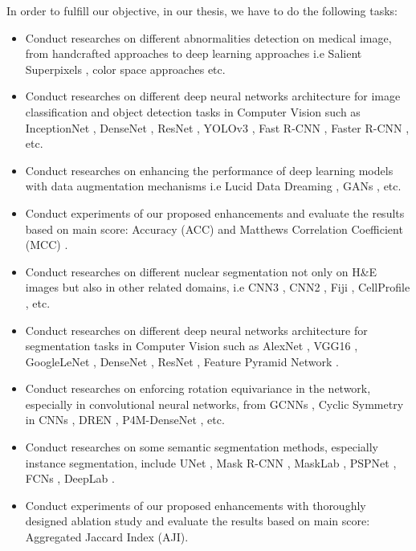 In order to fulfill our objective, in our thesis, we have to do the following tasks:
\begin{itemize}
\item Conduct researches on different abnormalities detection on medical image, from handcrafted approaches to deep learning approaches i.e Salient Superpixels \cite{bloodsalientsuperpixels}, color space approaches \cite{HSIColorDomain, active_blood_detect} etc. 

\item Conduct researches on different deep neural networks architecture for image classification and object detection tasks in Computer Vision such as InceptionNet \cite{inception}, DenseNet \cite{DenseNet}, ResNet \cite{Resnet}, YOLOv3 \cite{YOLOv3}, Fast R-CNN \cite{FastRCNN}, Faster R-CNN \cite{FasterRCNN},  etc.

\item Conduct researches on enhancing the performance of deep learning models with data augmentation mechanisms i.e Lucid Data Dreaming \cite{LucidDataDreaming_CVPR17_workshops}, GANs \cite{NIPS2014_5423}, etc.

\item Conduct experiments of our proposed enhancements and evaluate the results based on main score: Accuracy (ACC) and Matthews Correlation Coefficient (MCC) \cite{MATTHEWS1975442}.

\item Conduct researches on different nuclear segmentation not only on H\&E images but also in other related domains, i.e CNN3 \cite{he_dataset_kumar}, CNN2 \cite{cnn2}, Fiji \cite{fiji}, CellProfile \cite{cellprofile}, etc. 

\item Conduct researches on different deep neural networks architecture for segmentation tasks in Computer Vision such as AlexNet \cite{AlexNet}, VGG16 \cite{VGG16Net}, GoogleLeNet \cite{GoogleLeNet}, DenseNet \cite{DenseNet}, ResNet \cite{Resnet}, Feature Pyramid Network \cite{FPN}.

\item Conduct researches on enforcing rotation equivariance in the network, especially in convolutional neural networks, from GCNNs \cite{gcnn}, Cyclic Symmetry in CNNs \cite{cyclic_symmetry}, DREN \cite{dren}, P4M-DenseNet \cite{P4M-DenseNet}, etc.

\item Conduct researches on some semantic segmentation methods, especially instance segmentation, include UNet \cite{unet}, Mask R-CNN \cite{MaskRCNN}, MaskLab \cite{MaskLab}, PSPNet \cite{PSPNet}, FCNs \cite{FCNs}, DeepLab \cite{DeepLabv1,DeepLabv2,DeepLabv3,DeepLabv3+}.

\item Conduct experiments of our proposed enhancements with thoroughly designed ablation study and evaluate the results based on main score: Aggregated Jaccard Index \cite{he_dataset_kumar} (AJI).
\end{itemize}

